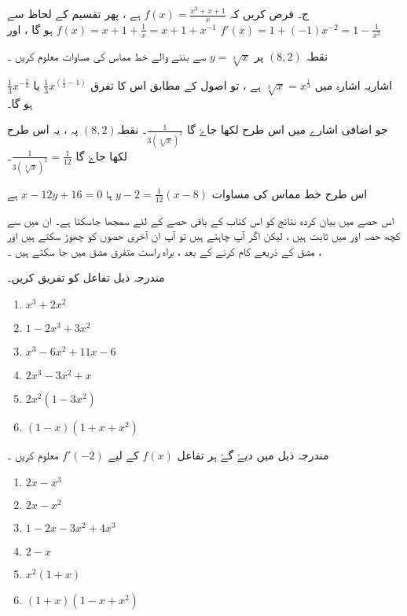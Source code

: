 ج۔ فرض کریں کہ \( f(x)= \frac{x^2+x+1}{x}\)  ہے ،
 پھر تقسیم کے لحاظ سے  \(f(x)=x+1+\frac{1}{x}=x+1+x^{-1}\) ہو گا 
، اور  \(f'(x)=1+(-1)x^{-2} = 1-\frac{1}{x^2}\)




نقطہ \((8,2)\) پر \(y=\sqrt[3]{x}\) سے بننے والے خط مماس کی مساوات معلوم کریں ۔ 

اشاریہ اشارہ میں \(\sqrt[3]{x}=x^{\frac{1}{3}}\) ہے ، تو اصول کے مطابق  اس کا تفرق \(\frac{1}{3}x^{(\frac{1}{3}-1)}\) یا \(\frac{1}{3}x^{-\frac{2}{3}}\) ہو گا۔

جو اضافی اشارے میں اس طرح لکھا جاۓ گا \(\frac{1}{3(\sqrt[3]{x})^2}\)۔  نقطہ\((8,2)\) پہ ، یہ اس طرح لکھا جاۓ گا \(\frac{1}{3(\sqrt[3]{x})^2}=\frac{1}{12}\)۔

اس طرح خط مماس کی مساوات \(y-2=\frac{1}{12}(x-8)\) ہا 
\(x-12y+16=0\) ہے

اس حصے میں بیان کردہ نتائج کو اس کتاب کے باقی حصے کے لئے سمجھا جاسکتا ہے۔ ان میں سے کچھ حصہ اور  میں ثابت ہیں ، لیکن اگر آپ چاہتے ہیں تو آپ ان آخری حصوں کو چھوڑ سکتے ہیں اور ، مشق  کے ذریعے کام کرنے کے بعد ، براہ راست متفرق  مشق  میں جا سکتے ہیں ۔


 
  مندرجہ ذیل تفاعل کو تفریق کریں۔

\begin{enumerate}[.a]
\item \(x^3+2x^2\)
\item \(1-2x^3+3x^2\)
\item \(x^3-6x^2+11x-6\)
\item \(2x^3-3x^2 +x\)
\item \(2x^2(1-3x^2)\)
\item \((1-x)(1+x+x^2)\)
\end{enumerate}

  مندرجہ ذیل میں دیۓ گۓ ہر تفاعل \(f(x)\) کے لیے \(f'(-2)\) معلوم کریں ۔

\begin{enumerate}[.a]
\item \(2x-x^3\)
\item \(2x-x^2\)
\item \(1-2x-3x^2+4x^3\)
\item \(2-x\)
\item \(x^2(1+x)\)
\item \((1+x)(1-x+x^2)\)
\end{enumerate}

